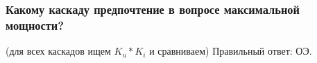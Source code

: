 \subsubsection{Какому каскаду предпочтение в вопросе максимальной мощности?}
(для всех каскадов ищем $K_{u}*K_{i}$ и сравниваем)
Правильный ответ: ОЭ.
